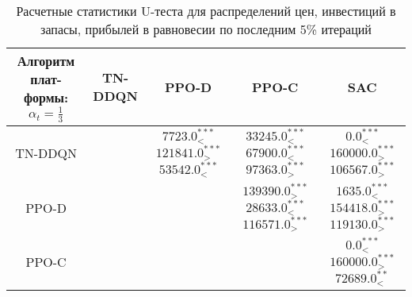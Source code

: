 \bgroup
\def\arraystretch{1.25}
\begin{table}[H]
	\caption{Расчетные статистики U-теста для распределений цен, инвестиций в запасы, прибылей в равновесии по последним 5\% итераций}
	\label{tables:ks_fixed:p_y_pi}
	\begin{center}
		\vspace{-0.5em}
		\begin{tabular}{c||cccc}
			\toprule
			\makecell{Алгоритм плат-\\ формы: $\alpha_t = \frac{1}{3}$} & TN-DDQN & PPO-D & PPO-C & SAC \\
			\midrule
			TN-DDQN & \makecell[c]{ \\[1ex] } & \makecell[c]{ $7723.0^{***}_{<} $\\$121841.0^{***}_{>} $\\$53542.0^{***}_{<} $\\[1ex] } & \makecell[c]{ $33245.0^{***}_{<} $\\$67900.0^{***}_{<} $\\$97363.0^{***}_{>} $\\[1ex] } & \makecell[c]{ $0.0^{***}_{<} $\\$160000.0^{***}_{>} $\\$106567.0^{***}_{>} $\\[1ex] } \\
			PPO-D & \makecell[c]{ \\[1ex] } & \makecell[c]{ \\[1ex] } & \makecell[c]{ $139390.0^{***}_{>} $\\$28633.0^{***}_{<} $\\$116571.0^{***}_{>} $\\[1ex] } & \makecell[c]{ $1635.0^{***}_{<} $\\$154418.0^{***}_{>} $\\$119130.0^{***}_{>} $\\[1ex] } \\
			PPO-C & \makecell[c]{ \\[1ex] } & \makecell[c]{ \\[1ex] } & \makecell[c]{ \\[1ex] } & \makecell[c]{ $0.0^{***}_{<} $\\$160000.0^{***}_{>} $\\$72689.0^{**}_{<} $\\[1ex] } \\
			\bottomrule
		\end{tabular}
	\end{center}
\end{table}
\egroup